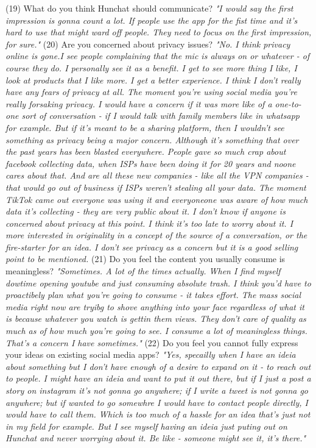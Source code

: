 \documentclass[12pt]{article}
\begin{document}
(19) What do you think Hunchat should communicate? \textit{"I would say the first impression is gonna count a lot. If people use the app for the fist time and it's hard to use that might ward off people. They need to focus on the first impression, for sure."}
(20) Are you concerned about privacy issues? \textit{"No. I think privacy online is gone.I see people complaining that the mic is always on or whatever - of course they do. I personally see it as a benefit. I get to see more thing I like, I look at products that I like more. I get a better experience. I think I don't really have any fears of privacy at all. The moment you're using social media you're really forsaking privacy. I would have a concern if it was more like of a one-to-one sort of conversation - if I would talk with family members like in whatsapp for example. But if it's meant to be a sharing platform, then I wouldn't see something as privacy being a major concern. Although it's something that over the past years has been blasted everywhere. People gave so much crap about facebook collecting data, when ISPs have been doing it for 20 years and noone cares about that. And are all these new companies - like all the VPN companies - that would go out of business if ISPs weren't stealing all your data. The moment TikTok came out everyone was using it and everyoneone was aware of how much data it's collecting - they are very public about it. I don't know if anyone is concerned about privacy at this point. I think it's too late to worry about it. I more interested in originality in a concept of the source of a conversation, or the fire-starter for an idea. I don't see privacy as a concern but it is a good selling point to be mentioned.}
(21) Do you feel the content you usually consume is meaningless? \textit{"Sometimes. A lot of the times actually. When I find myself dowtime opening youtube and just consuming absolute trash. I think you'd have to proactibely plan what you're going to consume - it takes effort. The mass social media right now are tryibg to shove anything into your face regardless of what it is because whatever you watch is gettin them views. They don't care of quality as much as of how much you're going to see. I consume a lot of meaningless things. That's a concern I have sometimes."}
(22) Do you feel you cannot fully express your ideas on existing social media apps? \textit{"Yes, specailly when I have an ideia about something but I don't have enough of a desire to expand on it - to reach out to people. I might have an ideia and want to put it out there, but if I just a post a story on instagram it's not gonna go anywhere; if I write a tweet is not gonna go anywhere; but if wanted to go somewhre I would have to contact people directly, I would have to call them. Which is too much of a hassle for an idea that's just not in my field for example. But I see myself having an ideia just puting out on Hunchat and never worrying about it. Be like - someone might see it, it's there."}
\end{document}

